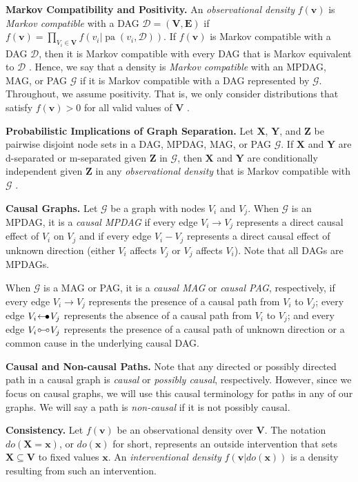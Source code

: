 \documentclass[twoside]{article}
\DeclareMathOperator{\pa}{pa}
\newcommand{\mb}[1]{\mathbf{#1}}
\newcommand{\g}[1][G]{\mathcal{#1}}
\newcommand{\arrowbullet}{
  \setlength{\unitlength}{1mm}
  \begin{picture}(5,1)(0,0)
    \put(0.2,0){$\leftarrow$}
    \put(3,0){$\bullet$}
  \end{picture}
}
\newcommand{\circcirc}{
  \setlength{\unitlength}{1mm}
  \begin{picture}(5,1)(0,0)
    \put(1,1){\circle{1}}
    \put(1.5,1){\line(1,0){2}}
    \put(4,1){\circle{1}}
  \end{picture}
}
\begin{document}
\textbf{Markov Compatibility and Positivity.}
An \textit{observational density} $f(\mb{v})$ is \textit{Markov compatible} with a DAG $\g[D] = (\mb{V},\mb{E})$ if $f(\mb{v})= \prod_{V_i \in \mb{V}}f(v_i|\pa(v_i,\g[D]))$. If $f(\mb{v})$ is Markov compatible with a DAG $\g[D]$, then it is Markov compatible with every DAG that is Markov equivalent to $\g[D]$ \citep{pearl2009causality}. Hence, we say that a density is \textit{Markov compatible} with an MPDAG, MAG, or PAG $\g$ if it is Markov compatible with a DAG represented by $\g$. Throughout, we assume positivity. That is, we only consider distributions that satisfy $f(\mb{v})>0$ for all valid values of $\mb{V}$ \citep{kivva2023identifiability}.

\textbf{Probabilistic Implications of Graph Separation.}
Let $\mb{X}$, $\mb{Y}$, and $\mb{Z}$ be pairwise disjoint node sets in a DAG, MPDAG, MAG, or PAG $\g$. If $\mb{X}$ and $\mb{Y}$ are d-separated or m-separated given $\mb{Z}$ in $\g$, then $\mb{X}$ and $\mb{Y}$ are conditionally independent given $\mb{Z}$ in any \textit{observational density} that is Markov compatible with $\g$ \citep{lauritzen1990independence, zhang2008causal, henckel2022graphical}. 


\textbf{Causal Graphs.}
Let $\g$ be a graph with nodes $V_i$ and $V_j$. When $\g$ is an MPDAG, it is a \textit{causal MPDAG} if every edge $V_i \to V_j$ represents a direct causal effect of $V_i$ on $V_j$ and if every edge $V_i - V_j$ represents a direct causal effect of unknown direction (either $V_i$ affects $V_j$ or $V_j$ affects $V_i$). Note that all DAGs are MPDAGs.

When $\g$ is a MAG or PAG, it is a \textit{causal MAG} or \textit{causal PAG}, respectively, if every edge $V_i \to V_j$ represents the presence of a causal path from $V_i$ to $V_j$; every edge $V_i \arrowbullet V_j$ represents the absence of a causal path from $V_i$ to $V_j$; and every edge $V_i \circcirc V_j$ represents the presence of a causal path of unknown direction or a common cause in the underlying causal DAG.

\textbf{Causal and Non-causal Paths.}
Note that any directed or possibly directed path in a causal graph is \textit{causal} or \textit{possibly causal}, respectively. However, since we focus on causal graphs, we will use this causal terminology for paths in any of our graphs. We will say a path is \textit{non-causal} if it is not possibly causal.

\textbf{Consistency.}
Let $f(\mb{v})$ be an observational density over $\mb{V}$. The notation $do(\mb{X} = \mb{x})$, or $do(\mb{x})$ for short, represents an outside intervention that sets $\mb{X} \subseteq \mb{V}$ to fixed values $\mb{x}$. An \textit{interventional density} $f(\mb{v}|do(\mb{x}))$ is a density resulting from such an intervention.
\end{document}
